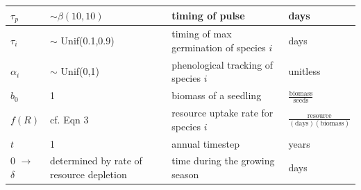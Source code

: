 \documentclass[11pt,letter]{article}
\begin{document}
\begin{center}
\begin{table}[h!]
\begin{tabular}{ | p{2.0cm} | p{3.5cm} | p{5.0cm} | p{4.0cm} |}
\(\tau_{p}\) & $\sim \beta(10,10)$ & timing of pulse & days \\ \hline
\(\tau_{i}\) & $\sim$ Unif(0.1,0.9) & timing of max germination of species \(i\) & days \\ \hline
\(\alpha_{i}\) & $\sim$ Unif(0,1) & phenological tracking of species \(i\) & unitless \\ \hline
\hline
\(b_{0}\) & 1 & biomass of a seedling & \(\frac{\text{biomass}}{\text{seeds}}\) \\ \hline
\(f(R)\) & cf. Eqn 3& resource uptake rate for species \(i\) & \(\frac{\text{resource}}{(\text{days})(\text{biomass})}\)\\ \hline
 \hline
\(t\) & 1 & annual timestep & years \\ \hline
\(0\) $\rightarrow$ \(\delta\) & determined by rate of resource depletion & time during the growing season & days \\ \hline
\hline
\end{tabular}
\label{tab:model}
\end{table}
\end{center}
\clearpage
\end{document}
